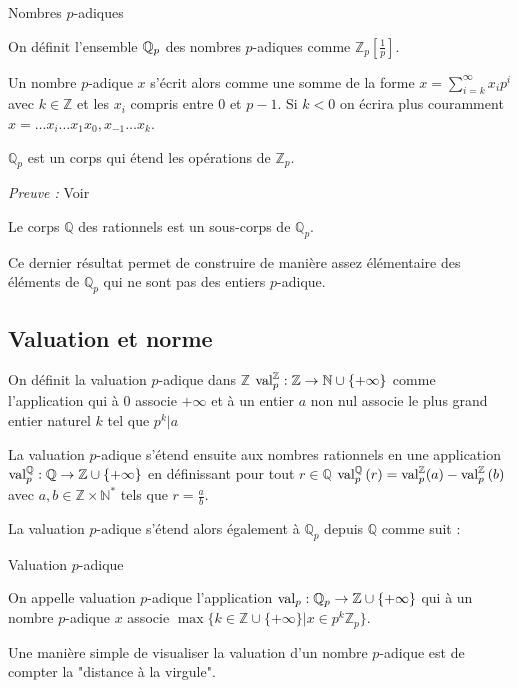 \begin{definition} Nombres $p$-adiques 

	On définit l'ensemble $\mathbb{Q}_p$ des nombres $p$-adiques comme $\mathbb{Z}_p \left[ \frac{1}{p} \right] $.   
\end{definition}

Un nombre $p$-adique $x$ s'écrit alors comme une somme de la forme $x = \sum \limits_{i=k}^{\infty} x_{i} p^i$ avec $k \in \mathbb{Z}$ et les $x_{i}$ compris entre $0$ et $p-1$. Si $k<0$ on écrira plus couramment $x = \ldots x_i \ldots x_1 x_0 , x_{-1}\ldots x_{k}$. 

\begin{propriete}
	$\mathbb{Q}_{p}$ est un corps qui étend les opérations de $\mathbb{Z}_p$.
\end{propriete}
\textit{Preuve :} Voir 

\begin{corollaire}
	Le corps $\mathbb{Q}$ des rationnels est un sous-corps de $\mathbb{Q}_{p} $.
\end{corollaire}

Ce dernier résultat permet de construire de manière assez élémentaire des éléments de $\mathbb{Q}_{p}$ qui ne sont pas des entiers $p$-adique.

\subsection{Valuation et norme}

On définit la valuation $p$-adique dans $\mathbb{Z}$ $\text{val}_p^{\mathbb{Z}}:\mathbb{Z}\to \mathbb{N}\cup \{+\infty\}  $ comme l'application qui à 0 associe $+\infty$ et à un entier $a$ non nul associe le plus grand entier naturel $k$ tel que $p^k | a$%

La valuation $p$-adique s'étend ensuite aux nombres rationnels en une application $\text{val}_p^{\mathbb{Q}} : \mathbb{Q} \to \mathbb{Z}\cup \{+\infty\}   $ en définissant pour tout $r \in \mathbb{Q}$  $\text{val}_p^{\mathbb{Q}} \left( r \right) = \text{val}_p^\mathbb{Z}(a)- \text{val}_p^\mathbb{Z}\left( b \right) $ avec $a,b \in \mathbb{Z} \times \mathbb{N}^*$ tels que $r=\frac{a}{b}.$   

La valuation $p$-adique s'étend alors également à $\mathbb{Q}_p$ depuis $\mathbb{Q}$ comme suit :
\begin{definition} Valuation $p$-adique
  
	On appelle valuation $p$-adique l'application $\text{val}_p: \mathbb{Q}_p \to \mathbb{Z}\cup \{+\infty\}  $ qui à un nombre $p$-adique $x$ associe $\max \{k \in \mathbb{Z}\cup \{+\infty\}| x\in p^k \mathbb{Z}_p\}$. 
\end{definition}
Une manière simple de visualiser la valuation d'un nombre $p$-adique est de compter la "distance à la virgule".

